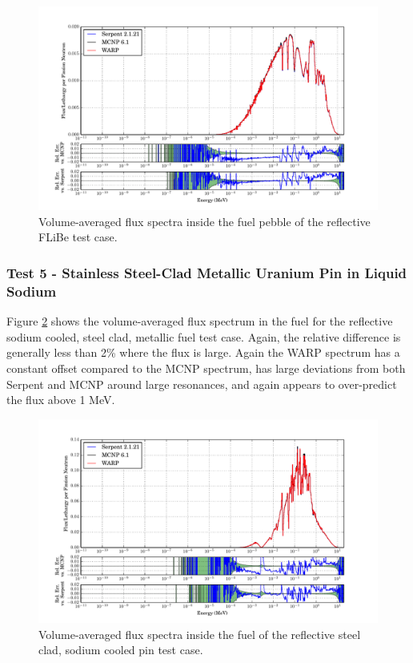 \documentclass[preprint,12pt]{elsarticle}
\begin{document}
\begin{figure}[h!]
\centering
\includegraphics[width=\textwidth,trim= 1cm 0cm 1cm 0cm]{graphics/flibe_spec.pdf}
\caption{Volume-averaged flux spectra inside the fuel pebble of the reflective FLiBe test case. \label{flibe_spec} }
\end{figure}

\newpage
\subsubsection{Test 5 - Stainless Steel-Clad Metallic Uranium Pin in Liquid Sodium}

Figure \ref{sodiumpin_spec} shows the volume-averaged flux spectrum in the fuel for the reflective sodium cooled, steel clad, metallic fuel test case.  Again, the relative difference is generally less than 2\% where the flux is large.  Again the WARP spectrum has a constant offset compared to the MCNP spectrum, has large deviations from both Serpent and MCNP around large resonances, and again appears to over-predict the flux above 1 MeV.

\begin{figure}[h!]
\centering
\includegraphics[width=\textwidth,trim= 1cm 0cm 1cm 0cm]{graphics/sodiumpin_spec.pdf}
\caption{Volume-averaged flux spectra inside the fuel of the reflective steel clad, sodium cooled pin test case. \label{sodiumpin_spec} }
\end{figure}
\end{document}
